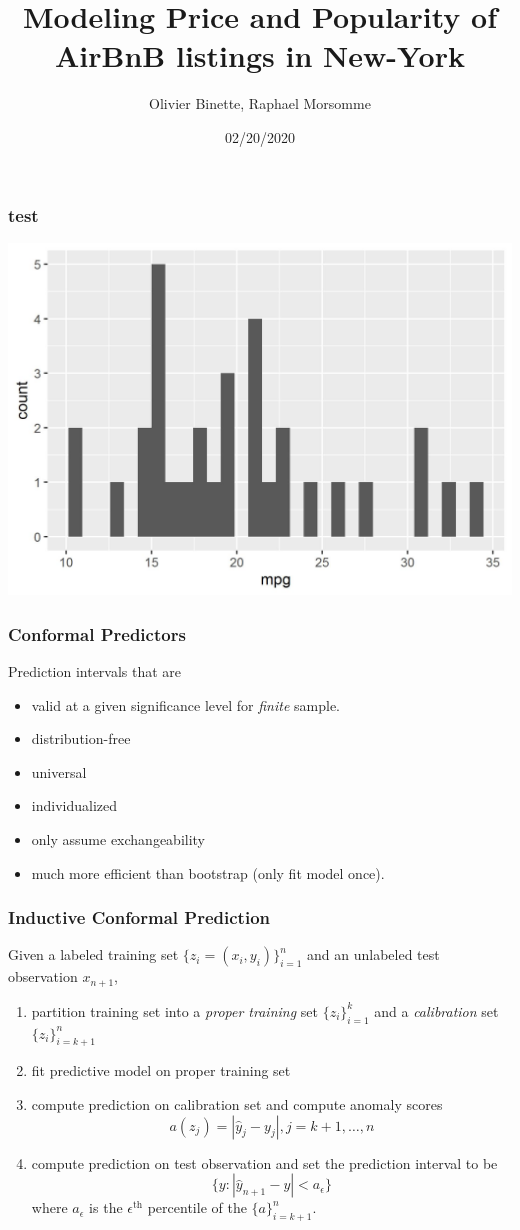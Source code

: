 \documentclass{beamer}
\title{Modeling Price and Popularity of AirBnB listings in New-York}
\author{Olivier Binette, Raphael Morsomme}
\institute{Department of Statistical Science, Duke University}
\date{02/20/2020}
\begin{document}
\frame{\titlepage}


\begin{frame} \frametitle{test}    
    \includegraphics[scale = 0.8]{test.jpeg}
\end{frame}

\begin{frame} \frametitle{Conformal Predictors}

Prediction intervals that are
\begin{itemize}
	\item valid at a given significance level for \textit{finite} sample.
	\item distribution-free
	\item universal
	\item individualized
	\item only assume exchangeability
	\item much more efficient than bootstrap (only fit model once).
\end{itemize}
\end{frame}


\begin{frame} \frametitle{Inductive Conformal Prediction}

Given a labeled training set $\{z_i = (x_i, y_i)\}_{i=1}^n$ and an unlabeled test observation $x_{n+1}$,
\begin{enumerate}
	\item partition training set into a \textit{proper training} set $\{z_i\}_{i=1}^k$ and a \textit{calibration} set $\{z_i \}_{i=k+1}^n$
	\item fit predictive model on proper training set
	\item compute prediction on calibration set and compute anomaly scores
	$$a(z_j) = |\hat{y}_j - y_j|, j = k+1, \dots, n$$
	\item compute prediction on test observation and set the prediction interval to be
	$$\{y: |\hat{y}_{n+1} - y| < a_\epsilon\}$$
	where $a_\epsilon$ is the $\epsilon^{\text{th}}$ percentile of the $\{a\}_{i=k+1}^n$.
	\end{enumerate}
\end{frame}
\end{document}
